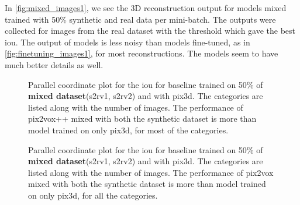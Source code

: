 In \autoref{fig:mixed_images1}, we see the 3D reconstruction output for models mixed trained with 50\% synthetic and real data per mini-batch.
The outputs were collected for images from the real dataset with the threshold which gave the best \gls{iou}.
The output of models is less noisy than models fine-tuned, as in \autoref{fig:finetuning_images1}, for most reconstructions.
The models seem to have much better details as well.


\begin{figure}
    \centering
    \resizebox{0.7\textwidth}{!}{}
    \caption{Parallel coordinate plot for the \gls{iou} for baseline  trained on 50\% of \textbf{mixed dataset}(\gls{s2rv1}, \gls{s2rv2}) and with pix3d.
    The categories are listed along with the number of images.
    The performance of pix2vox++ mixed with both the synthetic dataset is more than model trained on only pix3d, for most of the categories.
    }
    \label{fig:mixed2}
\end{figure}


\begin{figure}
    \centering
    \resizebox{0.7\textwidth}{!}{}
    \caption{Parallel coordinate plot for the \gls{iou} for baseline  trained on 50\% of \textbf{mixed dataset}(\gls{s2rv1}, \gls{s2rv2}) and with pix3d.
    The categories are listed along with the number of images.
    The performance of pix2vox mixed with both the synthetic dataset is more than model trained on only pix3d, for all the categories.}
    \label{fig:mixed3}
\end{figure}


